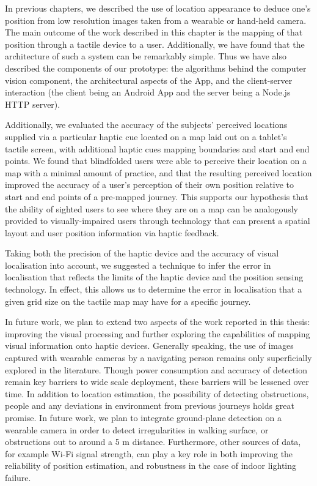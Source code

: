 In previous chapters, we described the use of location appearance to deduce one's position from low resolution images taken from a wearable or hand-held camera. The main outcome of the work described in this chapter is the mapping of that position through a tactile device to a user. Additionally, we have found that the architecture of such a system can be remarkably simple. Thus we have also described the components of our prototype: the algorithms behind the computer vision component, the architectural aspects of the App, and the client-server interaction (the client being an Android App and the server being a Node.js HTTP server).

Additionally, we evaluated the accuracy of the subjects' perceived locations supplied via a particular haptic cue located on a map laid out on a tablet's tactile screen, with additional haptic cues mapping boundaries and start and end points. We found that blindfolded users were able to perceive their location on a map with a minimal amount of practice, and that the resulting perceived location improved the accuracy of a user's perception of their own position relative to start and end points of a pre-mapped journey. This supports our hypothesis that the ability of sighted users to see where they are on a map can be analogously provided to visually-impaired users through technology that can present a spatial layout and user position information via haptic feedback.

Taking both the precision of the haptic device and the accuracy of visual localisation into account, we suggested a technique to infer the error in localisation that reflects the limits of the haptic device and the position sensing technology. In effect, this allows us to determine the error in localisation that a given grid size on the tactile map may have for a specific journey. 

In future work, we plan to extend two aspects of the work reported in this thesis: improving the visual processing and further exploring the capabilities of mapping visual information onto haptic devices. Generally speaking, the use of images captured with wearable cameras by a navigating person remains only superficially explored in the literature. Though power consumption and accuracy of detection remain key barriers to wide scale deployment, these barriers will be lessened over time. In addition to location estimation, the possibility of detecting obstructions, people and any deviations in environment from previous journeys holds great promise. In future work, we plan to integrate ground-plane detection on a wearable camera in order to detect irregularities in walking surface, or obstructions out to around a 5 m distance. Furthermore, other sources of data, for example Wi-Fi signal strength, can play a key role in both improving the reliability of position estimation, and robustness in the case of indoor lighting failure.

